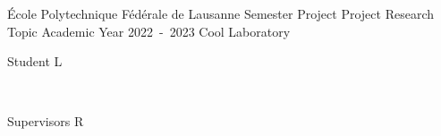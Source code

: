 \begin{cover}%
    {École Polytechnique Fédérale de Lausanne} %
    {Semester Project} %
    {Project Research Topic} %
    {Academic Year 2022~-~2023} %
    {Cool Laboratory} %
    \begin{reportauthors}%
        {Student}%
        {L}%
    \end{reportauthors}
    ~
    \begin{reportauthors}%
        {Supervisors}%
        {R}%
        \\
    \end{reportauthors}
\end{cover}
